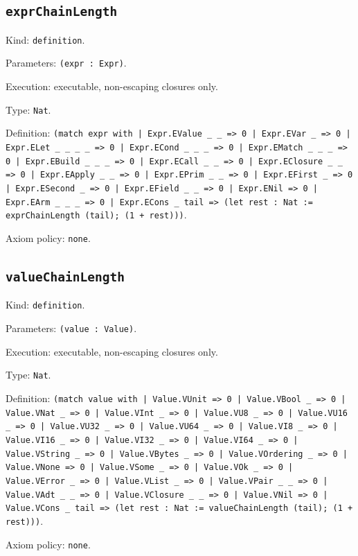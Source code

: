 \documentclass[11pt]{article}
\begin{document}
\subsection*{\texttt{exprChainLength}}
\noindent Kind: \texttt{definition}.\par
\noindent Parameters: \texttt{(expr : Expr)}.\par
\noindent Execution: executable, non-escaping closures only.\par
\noindent Type: \texttt{Nat}.\par
\noindent Definition: \texttt{(match expr with | Expr.EValue \_ \_ => 0 | Expr.EVar \_ => 0 | Expr.ELet \_ \_ \_ \_ => 0 | Expr.ECond \_ \_ \_ => 0 | Expr.EMatch \_ \_ \_ => 0 | Expr.EBuild \_ \_ \_ => 0 | Expr.ECall \_ \_ => 0 | Expr.EClosure \_ \_ => 0 | Expr.EApply \_ \_ => 0 | Expr.EPrim \_ \_ => 0 | Expr.EFirst \_ => 0 | Expr.ESecond \_ => 0 | Expr.EField \_ \_ => 0 | Expr.ENil => 0 | Expr.EArm \_ \_ \_ => 0 | Expr.ECons \_ tail => (let rest : Nat := exprChainLength (tail); (1 + rest)))}.\par
\noindent Axiom policy: \texttt{none}.\par
\subsection*{\texttt{valueChainLength}}
\noindent Kind: \texttt{definition}.\par
\noindent Parameters: \texttt{(value : Value)}.\par
\noindent Execution: executable, non-escaping closures only.\par
\noindent Type: \texttt{Nat}.\par
\noindent Definition: \texttt{(match value with | Value.VUnit => 0 | Value.VBool \_ => 0 | Value.VNat \_ => 0 | Value.VInt \_ => 0 | Value.VU8 \_ => 0 | Value.VU16 \_ => 0 | Value.VU32 \_ => 0 | Value.VU64 \_ => 0 | Value.VI8 \_ => 0 | Value.VI16 \_ => 0 | Value.VI32 \_ => 0 | Value.VI64 \_ => 0 | Value.VString \_ => 0 | Value.VBytes \_ => 0 | Value.VOrdering \_ => 0 | Value.VNone => 0 | Value.VSome \_ => 0 | Value.VOk \_ => 0 | Value.VError \_ => 0 | Value.VList \_ => 0 | Value.VPair \_ \_ => 0 | Value.VAdt \_ \_ => 0 | Value.VClosure \_ \_ => 0 | Value.VNil => 0 | Value.VCons \_ tail => (let rest : Nat := valueChainLength (tail); (1 + rest)))}.\par
\noindent Axiom policy: \texttt{none}.\par
\end{document}
